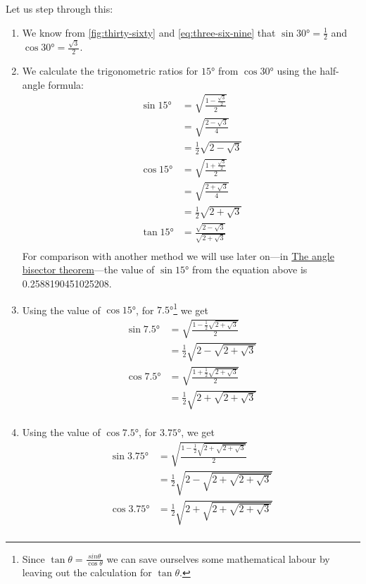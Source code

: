 \documentclass[
  a4paper,
]{article}
\begin{document}
Let us step through this:

\begin{enumerate}
\item
  We know from \cref{fig:thirty-sixty} and \cref{eq:three-six-nine} that
  \(\sin 30° = \frac{1}{2}\) and \(\cos 30° = \frac{\sqrt{3}}{2}\).
\item
  We calculate the trigonometric ratios for \(15°\) from \(\cos 30°\)
  using the half-angle formula: \[
  \begin{aligned}
  \sin 15° &= \sqrt{\frac{1 - \frac{\sqrt{3}}{2}}{2}}\\
  &= \sqrt{\frac{2 - \sqrt{3}}{4}}\\
  &= \frac{1}{2}\sqrt{2 - \sqrt{3}}\\
  \cos 15° &= \sqrt{\frac{1 + \frac{\sqrt{3}}{2}}{2}}\\
  &= \sqrt{\frac{2 + \sqrt{3}}{4}}\\
  &= \frac{1}{2}\sqrt{2 + \sqrt{3}}\\
  \tan 15° &= \frac{\sqrt{2 - \sqrt{3}}}{\sqrt{2 + \sqrt{3}}}\\
  \end{aligned}
  \] For comparison with another method we will use later on---in
  \hyperref[the-angle-bisector-theorem]{The angle bisector
  theorem}---the value of \(\sin 15°\) from the equation above is
  0.2588190451025208.
\item
  Using the value of \(\cos 15°\), for \(7.5°\)\footnote{Since
    \(\tan\theta = \frac{sin\theta}{\cos\theta}\) we can save ourselves
    some mathematical labour by leaving out the calculation for
    \(\tan\theta\).} we get \[
  \begin{aligned}
  \sin 7.5° &= \sqrt{\frac{1 - \frac{1}{2}\sqrt{2 + \sqrt{3}}}{2}}\\
  &= \frac{1}{2}\sqrt{2 - \sqrt{2 + \sqrt{3}}}\\
  \cos 7.5° &= \sqrt{\frac{1 + \frac{1}{2}\sqrt{2 + \sqrt{3}}}{2}}\\
  &= \frac{1}{2}\sqrt{2 + \sqrt{2 + \sqrt{3}}}\\
  \end{aligned}
  \]
\item
  Using the value of \(\cos 7.5°\), for \(3.75°\), we get \[
  \begin{aligned}
  \sin 3.75° &= \sqrt{\frac{1 - \frac{1}{2}\sqrt{2 + \sqrt{2 + \sqrt{3}}}}{2}}\\
  &= \frac{1}{2}\sqrt{2 - \sqrt{2 + \sqrt{2 + \sqrt{3}}}}\\
  \cos 3.75° &= \frac{1}{2}\sqrt{2 + \sqrt{2 + \sqrt{2 + \sqrt{3}}}}\\

\end{aligned}\]
\end{enumerate}
\end{document}
